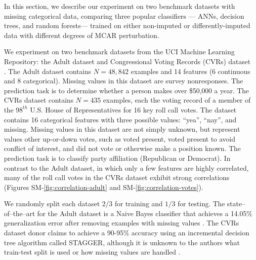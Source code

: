 \documentclass[10pt]{book}
\theoremstyle{definition}
\begin{document}
\par


\setcounter{chapter}{3}
\setcounter{equation}{0} %

In this section, we describe our experiment on two benchmark datasets with missing categorical data, comparing three popular classifiers --- ANNs, decision trees, and random forests--- trained on either non-imputed or differently-imputed data with different degrees of MCAR perturbation.

\par
{}

We experiment on two benchmark datasets from the UCI Machine Learning Repository: the Adult dataset and Congressional Voting Records (CVRs) dataset \citep{Lichman2013}. The Adult dataset contains $N=48,842$ examples and 14 features (6 continuous and 8 categorical). Missing values in this dataset are survey nonresponses. The prediction task is to determine whether a person makes over \$50,000 a year. The CVRs dataset contains $N=435$ examples, each the voting record of a member of the $98^{th}$ U.S. House of Representatives for 16 key roll call votes. The dataset contains 16 categorical features with three possible values: ``yea'', ``nay'', and missing. Missing values in this dataset are not simply unknown, but represent values other up-or-down votes, such as voted present, voted present to avoid conflict of interest, and did not vote or otherwise make a position known. The prediction task is to classify party affiliation (Republican or Democrat). In contrast to the Adult dataset, in which only a few features are highly correlated, many of the roll call votes in the CVRs dataset exhibit strong correlations (Figures SM-\ref{fig:correlation-adult} and SM-\ref{fig:correlation-votes}).

We randomly split each dataset $2/3$ for training and $1/3$ for testing. The state--of--the--art for the Adult dataset is a Naive Bayes classifier that achieves a 14.05\% generalization error after removing examples with missing values \citep{kohavi1996}. The CVRs dataset donor claims to achieve a 90-95\% accuracy using an incremental decision tree algorithm called STAGGER, although it is unknown to the authors what train-test split is used or how missing values are handled \citep{schlimmer1987,schlimmer1986}.
\end{document}
